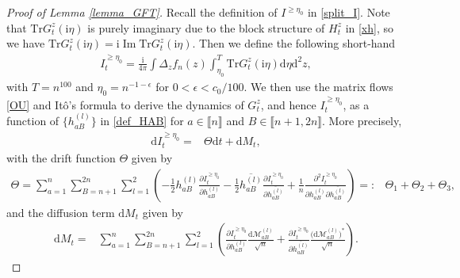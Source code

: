 \documentclass[10pt,reqno]{amsart}
\renewcommand{\Im}{\operatorname{Im}}
\newcommand{\II}{I^{\geq \eta_0}} %
\newcommand{\dd}{\mathrm{d}}
\newcommand{\ii}{\mathrm{i}}
\newcommand{\<}{\langle}
\renewcommand{\>}{\rangle}
\numberwithin{equation}{section}
\begin{document}
\begin{proof}[Proof of Lemma \ref{lemma_GFT}]
Recall the definition of $\II$ in \eqref{split_I}. Note that $\mathrm{Tr} G_t^{z}(\ii \eta)$ is purely imaginary due to the block structure of $H_t^z$ in \eqref{xh}, so we have $\mathrm{Tr} G_t^z(\ii \eta)=\ii\Im \mathrm{Tr} G_t^z(\ii \eta)$. Then we define the following short-hand
\begin{align}\label{def_L}
	\II_t=\frac{\ii}{4\pi} \int \Delta_z f_n(z) \int_{\eta_0}^{T} \mathrm{Tr} G^z_t(\ii \eta) \dd \eta \dd^2 z,  
\end{align}
with $T=n^{100}$ and $\eta_0=n^{-1-\epsilon}$ for $0<\epsilon<c_0/100$. We then use the matrix flows \eqref{OU} and Itô's formula to derive the dynamics of $G^{z}_t$, and hence $\II_t$, as a function of $\big\{h^{(l)}_{aB}\big\}$ in \eqref{def_HAB} for $a\in 
\llbracket n \rrbracket$ and $B\in \llbracket n+1,2n \rrbracket$. More precisely, 
\begin{align}
\dd \II_t=& \Theta \dd t+  \dd M_t,
\end{align}
with the drift function $\Theta$ given by
\begin{align}\label{eq_drift}
\Theta =   \sum_{a=1}^n \sum_{B=n+1}^{2n} \sum_{l=1}^2 \left(-\frac{1}{2}  h^{(l)}_{aB} \frac{  \partial \II_t}{\partial h^{(l)}_{aB}}  -\frac{1}{2} \overline{h^{(l)}_{aB}} \frac{\partial \II_t}{\partial \overline{h^{(l)}_{aB}}}  + \frac{1}{n} \frac{\partial^2 \II_t}{\partial h^{(l)}_{aB} \partial  \overline{h^{(l)}_{aB}}} \right)
=:&\Theta_1+\Theta_2+\Theta_3,
\end{align}
and the diffusion term $\dd M_t$ given by
\begin{align}\label{eq_diffusion}
\dd M_t =&\sum_{a=1}^n \sum_{B=n+1}^{2n} \sum_{l=1}^2  \left(\frac{ \partial \II_t}{\partial h^{(l)}_{aB}}  \frac{\dd\mathcal{M}^{(l)}_{aB}}{\sqrt{n}} + \frac{\partial \II_t}{\partial \overline{h^{(l)}_{aB}}} \frac{\big(\dd\mathcal{M}^{(l)}_{aB}\big)^*}{\sqrt{n}}  \right).

\end{align}
\end{proof}
\end{document}
